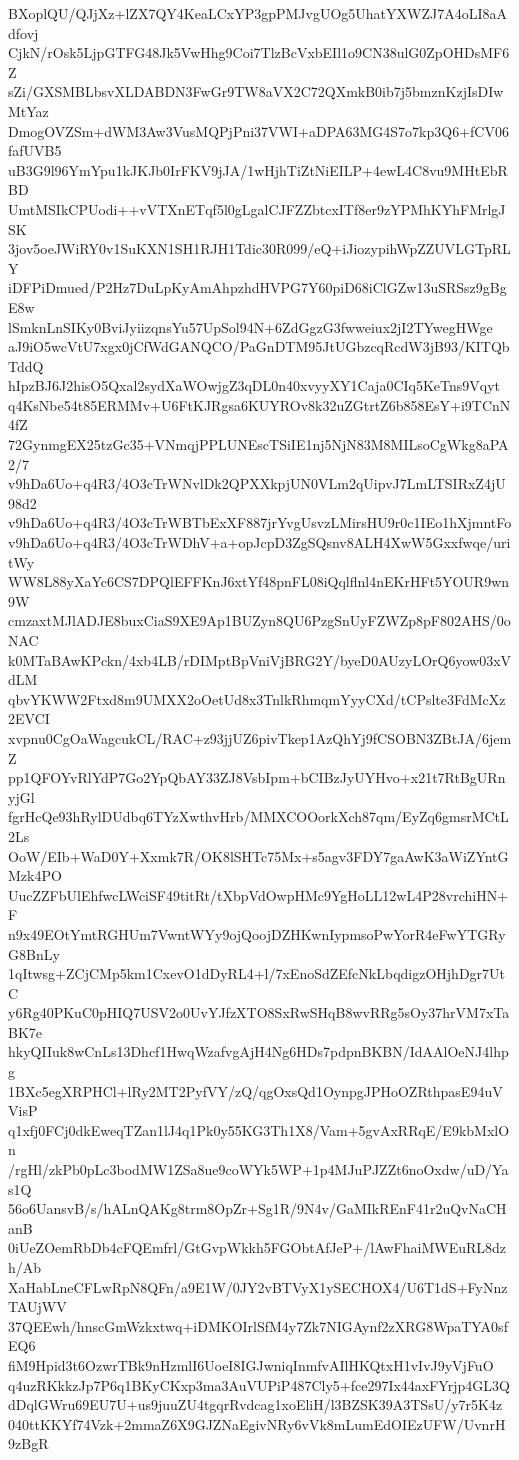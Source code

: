 BXoplQU/QJjXz+lZX7QY4KeaLCxYP3gpPMJvgUOg5UhatYXWZJ7A4oLI8aAdfovj
CjkN/rOsk5LjpGTFG48Jk5VwHhg9Coi7TlzBcVxbEIl1o9CN38ulG0ZpOHDsMF6Z
sZi/GXSMBLbsvXLDABDN3FwGr9TW8aVX2C72QXmkB0ib7j5bmznKzjIsDIwMtYaz
DmogOVZSm+dWM3Aw3VusMQPjPni37VWI+aDPA63MG4S7o7kp3Q6+fCV06fafUVB5
uB3G9l96YmYpu1kJKJb0IrFKV9jJA/1wHjhTiZtNiEILP+4ewL4C8vu9MHtEbRBD
UmtMSIkCPUodi++vVTXnETqf5l0gLgalCJFZZbtcxITf8er9zYPMhKYhFMrlgJSK
3jov5oeJWiRY0v1SuKXN1SH1RJH1Tdic30R099/eQ+iJiozypihWpZZUVLGTpRLY
iDFPiDmued/P2Hz7DuLpKyAmAhpzhdHVPG7Y60piD68iClGZw13uSRSsz9gBgE8w
lSmknLnSIKy0BviJyiizqnsYu57UpSol94N+6ZdGgzG3fwweiux2jI2TYwegHWge
aJ9iO5wcVtU7xgx0jCfWdGANQCO/PaGnDTM95JtUGbzcqRcdW3jB93/KITQbTddQ
hIpzBJ6J2hisO5Qxal2sydXaWOwjgZ3qDL0n40xvyyXY1Caja0CIq5KeTns9Vqyt
q4KsNbe54t85ERMMv+U6FtKJRgsa6KUYROv8k32uZGtrtZ6b858EsY+i9TCnN4fZ
72GynmgEX25tzGc35+VNmqjPPLUNEscTSiIE1nj5NjN83M8MILsoCgWkg8aPA2/7
v9hDa6Uo+q4R3/4O3cTrWNvlDk2QPXXkpjUN0VLm2qUipvJ7LmLTSIRxZ4jU98d2
v9hDa6Uo+q4R3/4O3cTrWBTbExXF887jrYvgUsvzLMirsHU9r0c1IEo1hXjmntFo
v9hDa6Uo+q4R3/4O3cTrWDhV+a+opJcpD3ZgSQsnv8ALH4XwW5Gxxfwqe/uritWy
WW8L88yXaYc6CS7DPQlEFFKnJ6xtYf48pnFL08iQqlflnl4nEKrHFt5YOUR9wn9W
cmzaxtMJlADJE8buxCiaS9XE9Ap1BUZyn8QU6PzgSnUyFZWZp8pF802AHS/0oNAC
k0MTaBAwKPckn/4xb4LB/rDIMptBpVniVjBRG2Y/byeD0AUzyLOrQ6yow03xVdLM
qbvYKWW2Ftxd8m9UMXX2oOetUd8x3TnlkRhmqmYyyCXd/tCPslte3FdMcXz2EVCI
xvpnu0CgOaWagcukCL/RAC+z93jjUZ6pivTkep1AzQhYj9fCSOBN3ZBtJA/6jemZ
pp1QFOYvRlYdP7Go2YpQbAY33ZJ8VsbIpm+bCIBzJyUYHvo+x21t7RtBgURnyjGl
fgrHcQe93hRylDUdbq6TYzXwthvHrb/MMXCOOorkXch87qm/EyZq6gmsrMCtL2Ls
OoW/EIb+WaD0Y+Xxmk7R/OK8lSHTc75Mx+s5agv3FDY7gaAwK3aWiZYntGMzk4PO
UucZZFbUlEhfwcLWciSF49titRt/tXbpVdOwpHMc9YgHoLL12wL4P28vrchiHN+F
n9x49EOtYmtRGHUm7VwntWYy9ojQoojDZHKwnIypmsoPwYorR4eFwYTGRyG8BnLy
1qItwsg+ZCjCMp5km1CxevO1dDyRL4+l/7xEnoSdZEfcNkLbqdigzOHjhDgr7UtC
y6Rg40PKuC0pHIQ7USV2o0UvYJfzXTO8SxRwSHqB8wvRRg5sOy37hrVM7xTaBK7e
hkyQIIuk8wCnLs13Dhcf1HwqWzafvgAjH4Ng6HDs7pdpnBKBN/IdAAlOeNJ4lhpg
1BXc5egXRPHCl+lRy2MT2PyfVY/zQ/qgOxsQd1OynpgJPHoOZRthpasE94uVVisP
q1xfj0FCj0dkEweqTZan1lJ4q1Pk0y55KG3Th1X8/Vam+5gvAxRRqE/E9kbMxlOn
/rgHl/zkPb0pLc3bodMW1ZSa8ue9coWYk5WP+1p4MJuPJZZt6noOxdw/uD/Yas1Q
56o6UansvB/s/hALnQAKg8trm8OpZr+Sg1R/9N4v/GaMIkREnF41r2uQvNaCHanB
0iUeZOemRbDb4cFQEmfrl/GtGvpWkkh5FGObtAfJeP+/lAwFhaiMWEuRL8dzh/Ab
XaHabLneCFLwRpN8QFn/a9E1W/0JY2vBTVyX1ySECHOX4/U6T1dS+FyNnzTAUjWV
37QEEwh/hnscGmWzkxtwq+iDMKOIrlSfM4y7Zk7NIGAynf2zXRG8WpaTYA0sfEQ6
fiM9Hpid3t6OzwrTBk9nHzmlI6UoeI8IGJwniqInmfvAIlHKQtxH1vIvJ9yVjFuO
q4uzRKkkzJp7P6q1BKyCKxp3ma3AuVUPiP487Cly5+fce297Ix44axFYrjp4GL3Q
dDqlGWru69EU7U+us9juuZU4tgqrRvdcag1xoEliH/l3BZSK39A3TSsU/y7r5K4z
040ttKKYf74Vzk+2mmaZ6X9GJZNaEgivNRy6vVk8mLumEdOIEzUFW/UvnrH9zBgR
